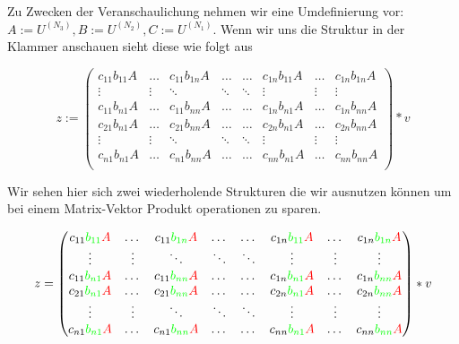 Zu Zwecken der Veranschaulichung nehmen wir eine Umdefinierung vor:
$A := U^{(N_3)}, B:= U^{(N_2)}, C:=U^{(N_1)}$.
Wenn wir uns die Struktur in der Klammer anschauen sieht diese wie folgt aus

\begin{equation} z:=
\begin{pmatrix}
c_{11} b_{11} A & \dots  & c_{11} b_{1n} A & \dots & \dots & c_{1n}b_{11}A & \dots & c_{1n}b_{1n}A  \\

\vdots & \vdots & \ddots & \ddots  & \ddots & \vdots & \vdots & \vdots \\
c_{11} b_{n1} A & \dots  & c_{11} b_{nn} A & \dots & \dots & c_{1n}b_{n1}A & \dots & c_{1n}b_{nn}A  \\
c_{21} b_{n1} A & \dots  & c_{21} b_{nn} A & \dots & \dots & c_{2n}b_{n1}A & \dots & c_{2n}b_{nn}A  \\
\vdots & \vdots & \ddots & \ddots  & \ddots & \vdots & \vdots & \vdots \\
c_{n1} b_{n1} A & \dots  & c_{n1} b_{nn} A & \dots & \dots & c_{nn}b_{n1}A & \dots & c_{nn}b_{nn}A  \\
\end{pmatrix} * v
\end{equation}

Wir sehen hier sich zwei wiederholende Strukturen die wir ausnutzen können um bei einem Matrix-Vektor Produkt operationen zu sparen.

\begin{equation} \label{eq:matrix} z=
\begin{pmatrix}
c_{11} \textcolor{green}{b_{11}} \textcolor{red}{A} & \dots  & c_{11} \textcolor{green}{b_{1n}} \textcolor{red}{A} & \dots & \dots & c_{1n}\textcolor{green}{b_{11}}\textcolor{red}{A} & \dots & c_{1n}\textcolor{green}{b_{1n}}\textcolor{red}{A}  \\

\vdots & \vdots & \ddots & \ddots  & \ddots & \vdots & \vdots & \vdots \\
c_{11} \textcolor{green}{b_{n1}} \textcolor{red}{A} & \dots  & c_{11} \textcolor{green}{b_{nn}} \textcolor{red}{A} & \dots & \dots & c_{1n}\textcolor{green}{b_{n1}}\textcolor{red}{A} & \dots & c_{1n}\textcolor{green}{b_{nn}}\textcolor{red}{A}  \\
c_{21} \textcolor{green}{b_{n1}} \textcolor{red}{A} & \dots  & c_{21} \textcolor{green}{b_{nn}} \textcolor{red}{A} & \dots & \dots & c_{2n}\textcolor{green}{b_{n1}}\textcolor{red}{A} & \dots & c_{2n}\textcolor{green}{b_{nn}}\textcolor{red}{A}  \\
\vdots & \vdots & \ddots & \ddots  & \ddots & \vdots & \vdots & \vdots \\
c_{n1} \textcolor{green}{b_{n1}} \textcolor{red}{A} & \dots  & c_{n1} \textcolor{green}{b_{nn}} \textcolor{red}{A} & \dots & \dots & c_{nn}\textcolor{green}{b_{n1}}\textcolor{red}{A} & \dots & c_{nn}\textcolor{green}{b_{nn}}\textcolor{red}{A}  \\
\end{pmatrix} * v
\end{equation}

